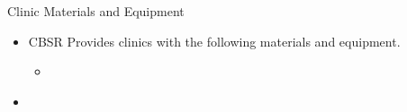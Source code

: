 \documentclass{beamer}
\begin{document}
\begin{frame}{Clinic Materials and Equipment}{}
  \begin{itemize}
    \item CBSR Provides clinics with the following materials and equipment.
      \begin{itemize}
        \item
      \end{itemize}
  \end{itemize}
\end{frame}

\begin{frame}{}{}
  \begin{itemize}
    \item
  \end{itemize}
\end{frame}
\end{document}
